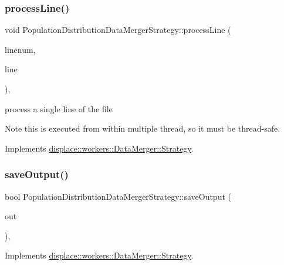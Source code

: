 \subsubsection{\texorpdfstring{processLine()}{processLine()}}
{\footnotesize\ttfamily void Population\+Distribution\+Data\+Merger\+Strategy\+::process\+Line (\begin{DoxyParamCaption}\item[{int}]{linenum,  }\item[{Q\+String}]{line }\end{DoxyParamCaption})\hspace{0.3cm}{\ttfamily [override]}, {\ttfamily [virtual]}}



process a single line of the file 

\begin{DoxyNote}{Note}
this is executed from within multiple thread, so it must be thread-\/safe. 
\end{DoxyNote}


Implements \mbox{\hyperlink{classdisplace_1_1workers_1_1_data_merger_1_1_strategy_affc6b82b186a4e8fbe2c8adf0a3d136a}{displace\+::workers\+::\+Data\+Merger\+::\+Strategy}}.

\mbox{\label{classdisplace_1_1workers_1_1_population_distribution_data_merger_strategy_a5fb32f900e449b7740b3ce4618b068c9}} 
\subsubsection{\texorpdfstring{saveOutput()}{saveOutput()}}
{\footnotesize\ttfamily bool Population\+Distribution\+Data\+Merger\+Strategy\+::save\+Output (\begin{DoxyParamCaption}\item[{Q\+String}]{out }\end{DoxyParamCaption})\hspace{0.3cm}{\ttfamily [override]}, {\ttfamily [virtual]}}



Implements \mbox{\hyperlink{classdisplace_1_1workers_1_1_data_merger_1_1_strategy_a789b4eee626c5947091e5153e450c91a}{displace\+::workers\+::\+Data\+Merger\+::\+Strategy}}.

